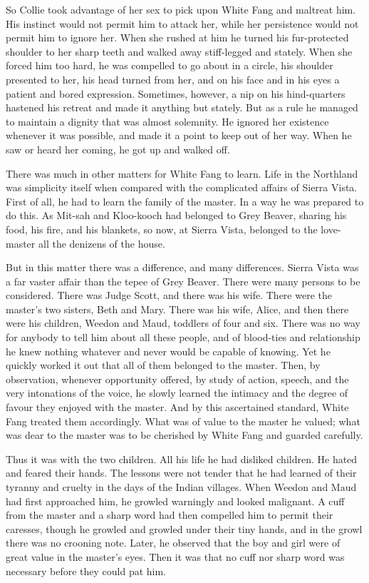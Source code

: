 \documentclass[10pt]{book}
\begin{document}
So Collie took advantage of her sex to pick upon White Fang and
maltreat him. His instinct would not permit him to attack her, while
her persistence would not permit him to ignore her. When she rushed at
him he turned his fur-protected shoulder to her sharp teeth and walked
away stiff-legged and stately. When she forced him too hard, he was
compelled to go about in a circle, his shoulder presented to her, his
head turned from her, and on his face and in his eyes a patient and
bored expression. Sometimes, however, a nip on his hind-quarters
hastened his retreat and made it anything but stately. But as a rule he
managed to maintain a dignity that was almost solemnity. He ignored her
existence whenever it was possible, and made it a point to keep out of
her way. When he saw or heard her coming, he got up and walked off.

There was much in other matters for White Fang to learn. Life in the
Northland was simplicity itself when compared with the complicated
affairs of Sierra Vista. First of all, he had to learn the family of
the master. In a way he was prepared to do this. As Mit-sah and
Kloo-kooch had belonged to Grey Beaver, sharing his food, his fire, and
his blankets, so now, at Sierra Vista, belonged to the love-master all
the denizens of the house.

But in this matter there was a difference, and many differences. Sierra
Vista was a far vaster affair than the tepee of Grey Beaver. There were
many persons to be considered. There was Judge Scott, and there was his
wife. There were the master’s two sisters, Beth and Mary. There was his
wife, Alice, and then there were his children, Weedon and Maud,
toddlers of four and six. There was no way for anybody to tell him
about all these people, and of blood-ties and relationship he knew
nothing whatever and never would be capable of knowing. Yet he quickly
worked it out that all of them belonged to the master. Then, by
observation, whenever opportunity offered, by study of action, speech,
and the very intonations of the voice, he slowly learned the intimacy
and the degree of favour they enjoyed with the master. And by this
ascertained standard, White Fang treated them accordingly. What was of
value to the master he valued; what was dear to the master was to be
cherished by White Fang and guarded carefully.

Thus it was with the two children. All his life he had disliked
children. He hated and feared their hands. The lessons were not tender
that he had learned of their tyranny and cruelty in the days of the
Indian villages. When Weedon and Maud had first approached him, he
growled warningly and looked malignant. A cuff from the master and a
sharp word had then compelled him to permit their caresses, though he
growled and growled under their tiny hands, and in the growl there was
no crooning note. Later, he observed that the boy and girl were of
great value in the master’s eyes. Then it was that no cuff nor sharp
word was necessary before they could pat him.
\end{document}

